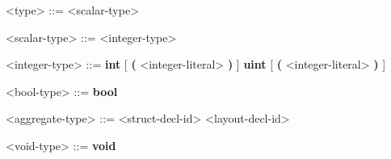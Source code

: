 
\begin{mdframed}
\begin{grammar}

<type> ::=
<scalar-type>

<scalar-type> ::=
<integer-type>

<integer-type> ::=
\textbf{int} [ \textbf{(} <integer-literal> \textbf{)} ]
\alt \textbf{uint} [ \textbf{(} <integer-literal> \textbf{)} ]

<bool-type> ::=
\textbf{bool}

<aggregate-type> ::=
<struct-decl-id>
<layout-decl-id>

<void-type> ::=
\textbf{void}

\end{grammar}
\end{mdframed}

